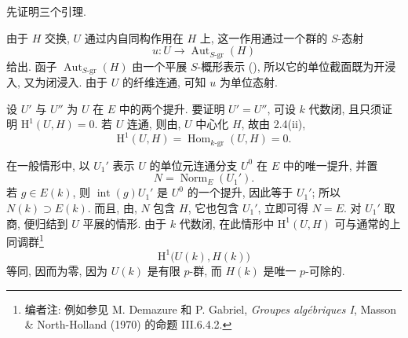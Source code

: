 
先证明三个引理.


由于 \(H\) 交换, \(U\) 通过内自同构作用在 \(H\) 上,
这一作用通过一个群的 \(S\)-态射
\[
  u:U\longrightarrow\operatorname{Aut}_{S\text{-}\mathrm{gr}}(H)
\]
给出. 函子 \(\operatorname{Aut}_{S\text{-}\mathrm{gr}}(H)\)
由一个平展 \(S\)-概形表示 (),
所以它的单位截面既为开浸入, 又为闭浸入.
由于 \(U\) 的纤维连通, 可知 \(u\) 为单位态射.


设 \(U'\) 与 \(U''\) 为 \(U\) 在 \(E\) 中的两个提升.
要证明 \(U'=U''\), 可设 \(k\) 代数闭, 且只须证明 \(\mathrm H^1(U,H)=0\).
若 \(U\) 连通, 则由,
\(U\) 中心化 \(H\), 故由 2.4(ii),
\[
  \mathrm H^1(U,H)
    =\operatorname{Hom}_{k\text{-}\mathrm{gr}}(U,H)=0.
\]

在一般情形中, 以 \(U_1'\) 表示 \(U\) 的单位元连通分支 \(U^0\) 在 \(E\) 中的唯一提升, 并置
\[
  N=\operatorname{Norm}_{E}(U_1').
\]
若 \(g\in E(k)\), 则 \(\operatorname{int}(g)U_1'\) 是 \(U^0\) 的一个提升,
因此等于 \(U_1'\); 所以 \(N(k)\supset E(k)\).
而且, 由, \(N\) 包含 \(H\),
它也包含 \(U_1'\), 立即可得 \(N=E\).
对 \(U_1'\) 取商, 便归结到 \(U\) 平展的情形.
由于 \(k\) 代数闭, 在此情形中 \(\mathrm H^1(U,H)\)
可与通常的上同调群\footnote{编者注: 例如参见 M. Demazure 和 P. Gabriel,
\emph{Groupes algébriques I}, Masson \& North-Holland (1970) 的命题 III.6.4.2.}
\[
  \mathrm H^1\bigl(U(k),H(k)\bigr)
\]
等同, 因而为零, 因为 \(U(k)\) 是有限 \(p\)-群, 而 \(H(k)\) 是唯一 \(p\)-可除的.



